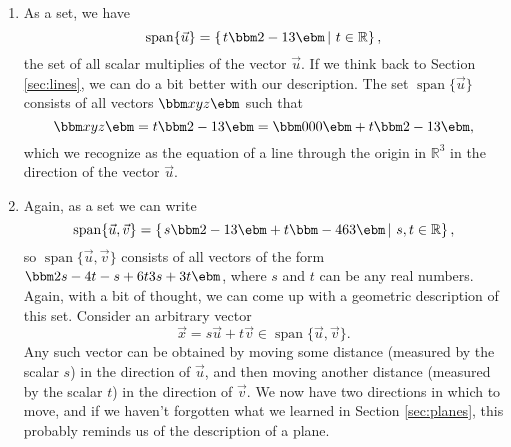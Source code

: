 \medskip

{\begin{enumerate}
\item As a set, we have
\[
\operatorname{span}\{\vec{u}\} = \left\{\left.t\bbm 2\\-1\\3\ebm \, \right|\, t\in \mathbb{R}\right\},
\]
the set of all scalar multiplies of the vector $\vec{u}$. If we think back to Section \ref{sec:lines}, we can do a bit better with our description. The set $\operatorname{span}\{\vec{u}\}$ consists of all vectors $\bbm x\\y\\z\ebm$ such that
\[
\bbm x\\y\\z\ebm = t\bbm 2\\-1\\3\ebm = \bbm 0\\0\\0\ebm + t\bbm 2\\-1\\3\ebm,
\]
which we recognize as the equation of a line through the origin in $\mathbb{R}^3$ in the direction of the vector $\vec{u}$.

\item Again, as a set we can write
\[
\operatorname{span}\{\vec{u},\vec{v}\} = \left\{\left.s\bbm 2\\-1\\3\ebm+t\bbm -4\\6\\3\ebm \, \right| \, s,t\in \mathbb{R}\right\},
\]
so $\operatorname{span}\{\vec{u},\vec{v}\}$ consists of all vectors of the form $\bbm 2s-4t\\-s+6t\\3s+3t\ebm$, where $s$ and $t$ can be any real numbers. Again, with a bit of thought, we can come up with a geometric description of this set. Consider an arbitrary vector
\[
\vec{x} = s\vec{u}+t\vec{v} \in \operatorname{span}\{\vec{u},\vec{v}\}.
\]
Any such vector can be obtained by moving some distance (measured by the scalar $s$) in the direction of $\vec{u}$, and then moving another distance (measured by the scalar $t$) in the direction of $\vec{v}$. We now have two directions in which to move, and if we haven't forgotten what we learned in Section \ref{sec:planes}, this probably reminds us of the description of a plane.


\end{enumerate}}
